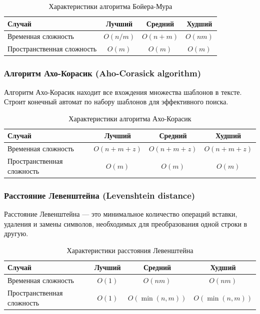 \documentclass[a4paper,12pt]{article}
\begin{document}
\begin{table}[H]
    \centering
    \begin{tabular}{|l|c|c|c|}
        \hline
        Случай & Лучший & Средний & Худший \\
        \hline
        Временная сложность & $O(n/m)$ & $O(n + m)$ & $O(nm)$ \\
        \hline
        Пространственная сложность & $O(m)$ & $O(m)$ & $O(m)$ \\
        \hline
    \end{tabular}
    \caption{Характеристики алгоритма Бойера-Мура}
\end{table}

\subsubsection{Алгоритм Ахо-Корасик (Aho-Corasick algorithm)}
\label{subsubsec:алгоритм-ахо-корасик-aho-corasick-algorithm}

Алгоритм Ахо-Корасик находит все вхождения множества шаблонов в тексте. Строит конечный автомат по набору шаблонов для эффективного поиска.

\begin{table}[H]
    \centering
    \begin{tabular}{|l|c|c|c|}
        \hline
        Случай & Лучший & Средний & Худший \\
        \hline
        Временная сложность & $O(n + m + z)$ & $O(n + m + z)$ & $O(n + m + z)$ \\
        \hline
        Пространственная сложность & $O(m)$ & $O(m)$ & $O(m)$ \\
        \hline
    \end{tabular}
    \caption{Характеристики алгоритма Ахо-Корасик}
\end{table}

\subsubsection{Расстояние Левенштейна (Levenshtein distance)}
\label{subsubsec:расстояние-левенштейна-levenshtein-distance}

Расстояние Левенштейна --- это минимальное количество операций вставки, удаления и замены символов, необходимых для преобразования одной строки в другую.

\begin{table}[H]
    \centering
    \begin{tabular}{|l|c|c|c|}
        \hline
        Случай & Лучший & Средний & Худший \\
        \hline
        Временная сложность & $O(1)$ & $O(nm)$ & $O(nm)$ \\
        \hline
        Пространственная сложность & $O(1)$ & $O(\min(n, m))$ & $O(\min(n, m))$ \\
        \hline
    \end{tabular}
    \caption{Характеристики расстояния Левенштейна}
\end{table}
\end{document}
